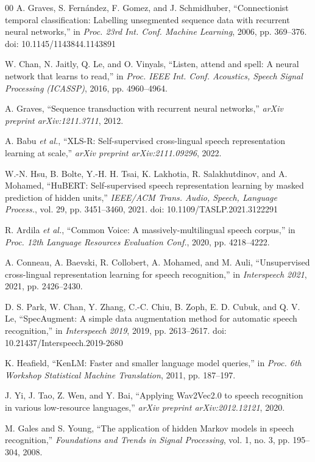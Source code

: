 \documentclass[conference]{IEEEtran}
\begin{document}
\begin{thebibliography}{00}
 A. Graves, S. Fern\'andez, F. Gomez, and J. Schmidhuber, ``Connectionist temporal classification: Labelling unsegmented sequence data with recurrent neural networks,'' in \textit{Proc. 23rd Int. Conf. Machine Learning}, 2006, pp. 369--376. doi: 10.1145/1143844.1143891

 W. Chan, N. Jaitly, Q. Le, and O. Vinyals, ``Listen, attend and spell: A neural network that learns to read,'' in \textit{Proc. IEEE Int. Conf. Acoustics, Speech Signal Processing (ICASSP)}, 2016, pp. 4960--4964.

 A. Graves, ``Sequence transduction with recurrent neural networks,'' \textit{arXiv preprint arXiv:1211.3711}, 2012.

 A. Babu \textit{et al.}, ``XLS-R: Self-supervised cross-lingual speech representation learning at scale,'' \textit{arXiv preprint arXiv:2111.09296}, 2022.

 W.-N. Hsu, B. Bolte, Y.-H. H. Tsai, K. Lakhotia, R. Salakhutdinov, and A. Mohamed, ``HuBERT: Self-supervised speech representation learning by masked prediction of hidden units,'' \textit{IEEE/ACM Trans. Audio, Speech, Language Process.}, vol. 29, pp. 3451--3460, 2021. doi: 10.1109/TASLP.2021.3122291

 R. Ardila \textit{et al.}, ``Common Voice: A massively-multilingual speech corpus,'' in \textit{Proc. 12th Language Resources Evaluation Conf.}, 2020, pp. 4218--4222.

 A. Conneau, A. Baevski, R. Collobert, A. Mohamed, and M. Auli, ``Unsupervised cross-lingual representation learning for speech recognition,'' in \textit{Interspeech 2021}, 2021, pp. 2426--2430.

 D. S. Park, W. Chan, Y. Zhang, C.-C. Chiu, B. Zoph, E. D. Cubuk, and Q. V. Le, ``SpecAugment: A simple data augmentation method for automatic speech recognition,'' in \textit{Interspeech 2019}, 2019, pp. 2613--2617. doi: 10.21437/Interspeech.2019-2680

 K. Heafield, ``KenLM: Faster and smaller language model queries,'' in \textit{Proc. 6th Workshop Statistical Machine Translation}, 2011, pp. 187--197.

 J. Yi, J. Tao, Z. Wen, and Y. Bai, ``Applying Wav2Vec2.0 to speech recognition in various low-resource languages,'' \textit{arXiv preprint arXiv:2012.12121}, 2020.

 M. Gales and S. Young, ``The application of hidden Markov models in speech recognition,'' \textit{Foundations and Trends in Signal Processing}, vol. 1, no. 3, pp. 195--304, 2008.


\end{thebibliography}
\end{document}
